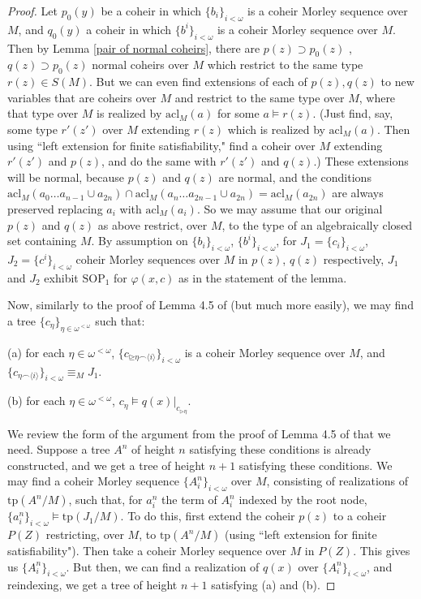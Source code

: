 \documentclass{amsart}
\theoremstyle{definition}
\theoremstyle{remark}
\numberwithin{equation}{section}
\begin{document}
\begin{proof}
    Let $p_{0}(y)$ be a coheir in which $\{b_{i}\}_{i < \omega}$ is a coheir Morley sequence over $M$, and $q_{0}(y)$ a coheir in which $\{b^{i}\}_{i < \omega}$ is a coheir Morley sequence over $M$. Then by Lemma \ref{pair of normal coheirs}, there are $p(z) \supset p_{0}(z)$ , $q(z) \supset p_{0}(z)$ normal coheirs over $M$ which restrict to the same type $r(z) \in S(M)$. But we can even find extensions of each of $p(z), q(z)$ to new variables that are coheirs over $M$ and restrict to the same type over $M$, where that type over $M$ is realized by $\mathrm{acl}_{M}(a)$ for some $a \models r(z)$. (Just find, say, some type $r'(z')$ over $M$ extending $r(z)$ which is realized by $\mathrm{acl}_{M}(a)$. Then using ``left extension for finite satisfiability," find a coheir over $M$ extending $r'(z')$ and $p(z)$, and do the same with $r'(z')$ and $q(z)$.) These extensions will be normal, because $p(z)$ and $q(z)$ are normal, and the conditions $\mathrm{acl}_{M}(a_{0} \ldots a_{n-1} \cup a_{2n}) \cap \mathrm{acl}_{M}(a_{n} \ldots a_{2n-1} \cup a_{2n})=\mathrm{acl}_{M}(a_{2n})$ are always preserved replacing $a_{i}$ with $\mathrm{acl}_{M}(a_{i})$. So we may assume that our original $p(z)$ and $q(z)$ as above restrict, over $M$, to the type of an algebraically closed set containing $M$. By assumption on $\{b_{i}\}_{i < \omega}$, $\{b^{i}\}_{i < \omega}$, for $J_{1} = \{c_{i}\}_{i < \omega}$, $J_{2}=\{c^{i}\}_{i < \omega}$ coheir Morley sequences over $M$ in $p(z)$, $q(z)$ respectively, $J_{1}$ and $J_{2}$ exhibit $\mathrm{SOP}_{1}$ for $\varphi(x, c)$ as in the statement of the lemma.

    Now, similarly to the proof of Lemma 4.5 of \cite{NSOP2} (but much more easily), we may find a tree $\{c_{\eta}\}_{\eta \in \omega^{< \omega}}$ such that:

(a) for each $\eta \in \omega^{<\omega}$, $\{c_{\unrhd \eta \smallfrown \langle i \rangle}\}_{i < \omega}$ is a coheir Morley sequence over $M$, and $\{c_{ \eta \smallfrown \langle i \rangle}\}_{i < \omega} \equiv_{M} J_{1}$.

(b) for each $\eta \in \omega^{<\omega}$, $c_{\eta} \models q(x)|_{c_{\rhd \eta}}$.


We review the form of the argument from the proof of Lemma 4.5 of \cite{NSOP2} that we need. Suppose a tree $A^{n}$ of height $n$ satisfying these conditions is already constructed, and we get a tree of height $n+1$ satisfying these conditions. We may find a coheir Morley sequence $\{A^{n}_{i}\}_{i < \omega}$ over $M$, consisting of realizations of $\mathrm{tp}(A^{n}/M)$, such that, for $a^{n}_{i}$ the term of $A_{i}^{n}$ indexed by the root node, $\{a^{n}_{i}\}_{i< \omega} \models \mathrm{tp}(J_{1}/M)$. To do this, first extend the coheir $p(z)$ to a coheir $P(Z)$ restricting, over $M$, to $\mathrm{tp}(A^{n}/M)$ (using ``left extension for finite satisfiability"). Then take a coheir Morley sequence over $M$ in $P(Z)$. This gives us $\{A^{n}_{i}\}_{i < \omega}$. But then, we can find a realization of $q(x)$ over $\{A^{n}_{i}\}_{i < \omega}$, and reindexing, we get a tree of height $n+1$ satisfying (a) and (b).


\end{proof}
\end{document}
